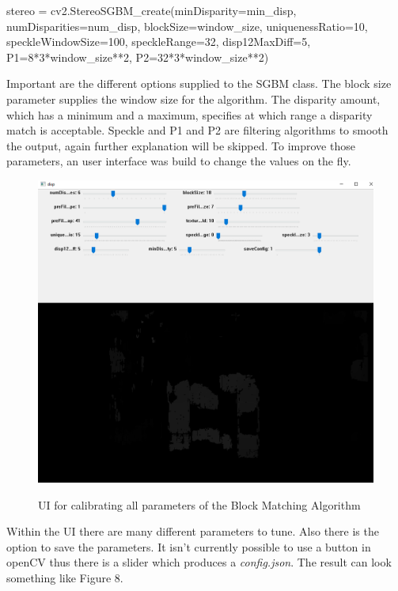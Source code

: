 \documentclass[journal,onecolumn]{IEEEtran}
\begin{document}
\begin{python}
stereo = cv2.StereoSGBM_create(minDisparity=min_disp,
			       numDisparities=num_disp,
			       blockSize=window_size,
			       uniquenessRatio=10,
			       speckleWindowSize=100,
			       speckleRange=32,
			       disp12MaxDiff=5,
			       P1=8*3*window_size**2,
			       P2=32*3*window_size**2)
\end{python}
Important are the different options supplied to the SGBM class. The block size parameter supplies the window size for the algorithm. The disparity amount, which has a minimum and a maximum, specifies at which range a disparity match is acceptable. Speckle and P1 and P2 are filtering algorithms to smooth the output\cite{stereoSGBM}, again further explanation will be skipped.
To improve those parameters, an user interface was build to change the values on the fly.
\begin{figure}[H]
	\centering
	\includegraphics[scale=0.5]{calibrateUI.png}
	\label{UI}
	\captionsetup{justification=centering}
	\caption{UI for calibrating all parameters of the Block Matching Algorithm}
\end{figure}
\noindent
Within the UI there are many different parameters to tune. Also there is the option to save the parameters. It isn't currently possible to use a button in openCV thus there is a slider which produces a \emph{config.json}. The result can look something like Figure 8.
\end{document}
